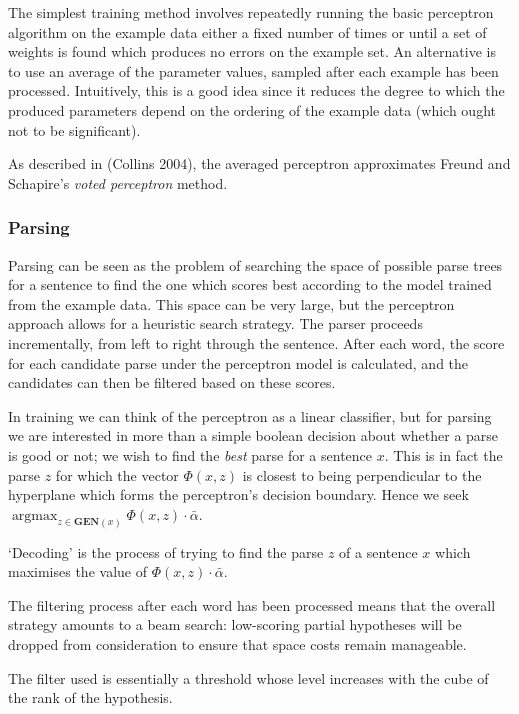 \documentclass[11pt]{article}
\begin{document}
The simplest training method involves repeatedly running the basic perceptron
algorithm on the example data either a fixed number of times or until a set of
weights is found which produces no errors on the example set. An alternative is
to use an average of the parameter values, sampled after each example has been
processed. Intuitively, this is a good idea since it reduces the degree to
which the produced parameters depend on the ordering of the example data (which
ought not to be significant).

As described in (Collins 2004)\cite{Collins2004}, the averaged perceptron approximates Freund and Schapire's\cite{Freund1999} \emph{voted perceptron} method. 


\subsubsection*{Parsing}
Parsing can be seen as the problem of searching the space of possible parse
trees for a sentence to find the one which scores best according to the model
trained from the example data. This space can be very large, but the perceptron
approach allows for a heuristic search strategy. The parser proceeds
incrementally, from left to right through the sentence. After each word, the
score for each candidate parse under the perceptron model is calculated, and
the candidates can then be filtered based on these scores. 

In training we can think of the perceptron as a linear classifier, but for
parsing we are interested in more than a simple boolean decision about whether
a parse is good or not; we wish to find the \emph{best} parse for a sentence
$x$. This is in fact the parse $z$ for which the vector $\Phi(x, z)$ is closest
to being perpendicular to the hyperplane which forms the perceptron's decision
boundary. Hence we seek $\operatorname{arg max}_{z \in \textbf{GEN}(x)} \Phi(x, z) \cdot \bar{\alpha}$.

`Decoding' is the process of trying to find the parse $z$ of a sentence $x$ which maximises the value of $\Phi(x,z) \cdot \bar{\alpha}$.

The filtering process after each word has been processed means that the overall
strategy amounts to a beam search: low-scoring partial hypotheses will be
dropped from consideration to ensure that space costs remain manageable.

The filter used is essentially a threshold whose level increases with the cube
of the rank of the hypothesis.
\end{document}
